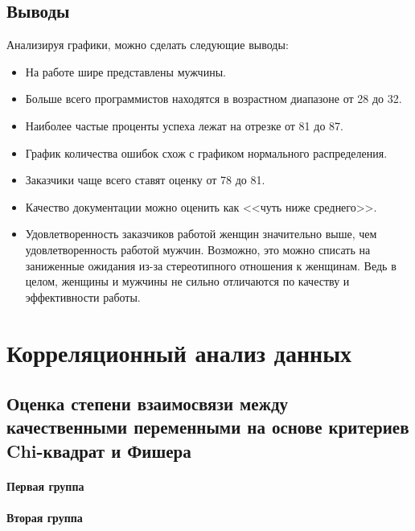 \subsection{Выводы}

Анализируя графики, можно сделать следующие выводы:

\begin{itemize}
	\item На работе шире представлены мужчины.
	\item Больше всего программистов находятся в возрастном диапазоне от 28 до 32.
	\item Наиболее частые проценты успеха лежат на отрезке от 81 до 87.
	\item График количества ошибок схож с графиком нормального распределения.
	\item Заказчики чаще всего ставят оценку от 78 до 81.
	\item Качество документации можно оценить как <<чуть ниже среднего>>.
	\item Удовлетворенность заказчиков работой женщин значительно выше, чем удовлетворенность работой мужчин. Возможно, это можно списать на заниженные ожидания из-за стереотипного отношения к женщинам. Ведь в целом, женщины и мужчины не сильно отличаются по качеству и эффективности работы.
\end{itemize}












\section{Корреляционный анализ данных}

\subsection{Оценка степени взаимосвязи между качественными переменными на основе критериев Chi-квадрат и Фишера}

\paragraph{Первая группа}

\paragraph{Вторая группа}

